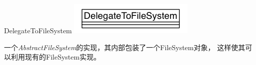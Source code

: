 \begin{XeClass}{DelegateToFileSystem}
\includegraphics[width=\textwidth]{cdig/DelegateToFileSystem.png}
     
 一个\emph{AbstractFileSystem}的实现，其内部包装了一个FileSystem对象，
 这样使其可以利用现有的FileSystem实现。

\end{XeClass}
